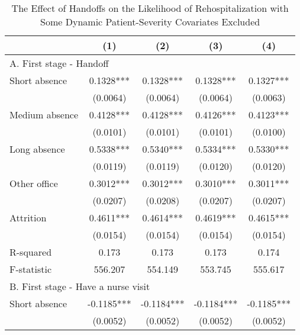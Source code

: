 \documentclass[final,12pt, notitlepage]{article}
\begin{document}
\begin{singlespace}
\clearpage
\begin{table}[H]
\footnotesize
\setlength\tabcolsep{0pt}
\centering
\caption{The Effect of Handoffs on the Likelihood of Rehospitalization with Some Dynamic Patient-Severity Covariates Excluded}
\label{tab:iv_noendog}
\begin{threeparttable}
{
\def\sym#1{\ifmmode^{#1}\else\(^{#1}\)\fi}
\begin{tabular*}{\textwidth}{l@{\extracolsep{\fill}}*{4}{c}}
\toprule
                    &\multicolumn{1}{c}{(1)}&\multicolumn{1}{c}{(2)}&\multicolumn{1}{c}{(3)}&\multicolumn{1}{c}{(4)}\\
\midrule
\multicolumn{5}{l}{A. First stage - Handoff} \\
Short absence       &      0.1328***&      0.1328***&      0.1328***&      0.1327***\\
                    &    (0.0064)   &    (0.0064)   &    (0.0064)   &    (0.0063)   \\
Medium absence      &      0.4128***&      0.4128***&      0.4126***&      0.4123***\\
                    &    (0.0101)   &    (0.0101)   &    (0.0101)   &    (0.0100)   \\
Long absence        &      0.5338***&      0.5340***&      0.5334***&      0.5330***\\
                    &    (0.0119)   &    (0.0119)   &    (0.0120)   &    (0.0120)   \\
Other office        &      0.3012***&      0.3012***&      0.3010***&      0.3011***\\
                    &    (0.0207)   &    (0.0208)   &    (0.0207)   &    (0.0207)   \\
Attrition           &      0.4611***&      0.4614***&      0.4619***&      0.4615***\\
                    &    (0.0154)   &    (0.0154)   &    (0.0154)   &    (0.0154)   \\
R-squared           &       0.173   &       0.173   &       0.173   &       0.174   \\
F-statistic         &     556.207   &     554.149   &     553.745   &     555.617   \\
\multicolumn{5}{l}{B. First stage - Have a nurse visit} \\
Short absence       &     -0.1185***&     -0.1184***&     -0.1184***&     -0.1185***\\
                    &    (0.0052)   &    (0.0052)   &    (0.0052)   &    (0.0052)   \\

\end{tabular*}}
\end{threeparttable}
\end{table}
\end{singlespace}
\end{document}
